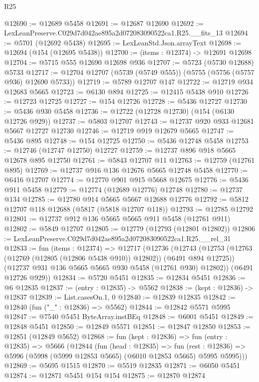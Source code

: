 \begin{lexlean}{R25}
\begin{coremodule}
@12690 := @12689 @5458
@12691 := @12687 @12690
@12692 := LexLeanPreserve.C029d7d042ae895a2d072083090522ca1.R25.__fits_13
@12694 := @5701 (@12692 @5438)
@12695 := LexLeanStd.Json.arrayText
@12698 := @12694 (@154 (@12695 @5438))
@12700 := (items : @12374) -> @12691 @12698
@12704 := @5715 @555 @12690 @12698 @936
@12707 := @5723 (@5730 @12688) @5733
@12717 := @12704 @12707 (@5739 (@5749 @555)) (@5755 (@5756 (@5757 @936) @12690 @5733))
@12719 := @5789 @12707 @147
@12722 := @12719 @934 @12683 @5665
@12723 := @6130 @894
@12725 := @12415 @5438 @910
@12726 := @12723 @12725
@12727 := @154 @12726
@12728 := @5436 @12727
@12730 := @5436 @930 @5458
@12736 := @12722 (@12728 @12730) (@154 (@6130 @12726 @929))
@12737 := @5803 @12707
@12743 := @12737 @920 @933 @12681 @5667 @12727 @12730
@12746 := @12719 @919 @12679 @5665
@12747 := @5436 @895
@12748 := @154 @12725
@12750 := @5436 @12748 @5458
@12753 := @12746 (@12747 @12750) @12727
@12759 := @12737 @896 @918 @5665 @12678 @895 @12750
@12761 := @5843 @12707 @11
@12763 := @12759 (@12761 @895)
@12769 := @12737 @916 @136 @12676 @5665 @12748 @5458
@12770 := @6416 @12707
@12774 := @12770 @901 @915 @5668 @12675
@12776 := @5436 @911 @5458
@12779 := @12774 (@12689 @12776) @12748
@12780 := @12737 @134
@12785 := @12780 @914 @5665 @5667 @12688 @12776
@12792 := @5812 @12707 @118 @12688 (@5817 (@5818 @12707 @118))
@12793 := @12785 @12792
@12801 := @12737 @912 @136 @5665 @5665 @911 @5458 (@12761 @911)
@12802 := @5849 @12707
@12805 := @12779 (@12793 (@12801 @12802))
@12806 := LexLeanPreserve.C029d7d042ae895a2d072083090522ca1.R25.__rel_31
@12833 := fun (items : @12374) =>
  @12717
    (@12736
      (@12743
        (@12753 (@12763 (@12769 (@12805 (@12806 @5438 @910)) @12802)) (@6491 @894 @12725))
        (@12737 @931 @136 @5665 @5665 @930 @5458 (@12761 @930) @12802))
      (@6491 @12726 @929))
@12834 := @5720 @5451
@12835 := @12834 @5451
@12836 := @6 @12835
@12837 := (entry : @12835) -> @5562
@12838 := (kept : @12836) -> @12837
@12839 := List.casesOn.{1, 0}
@12840 := @12839 @12835
@12842 := @12840 (fun ("_" : @12836) => @5562)
@12844 := @12842 @5571 @5995
@12847 := @7540 @5451 ByteArray.instBEq
@12848 := @6001 @5451
@12849 := @12848 @5451
@12850 := @12849 @5571
@12851 := @12847 @12850
@12853 := @12851 (@12849 @5652)
@12868 := fun (kept : @12836) =>
  fun (entry : @12835) =>
  @5666
    (@12844
      (fun (head : @12835) =>
      fun (rest : @12836) => @5996 (@5998 (@5999 @12853 @5665) (@6010 @12853 @5665) @5995 @5995)))
@12869 := @5695 @1515
@12870 := @5519 @12835
@12871 := @6050 @5451
@12874 := @12871 @5451 @154 @154
@12875 := @12870 @12874

\end{coremodule}
\end{lexlean}
